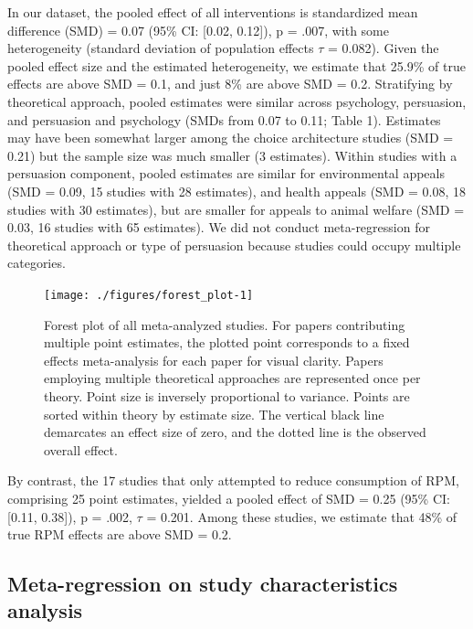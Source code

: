 \documentclass[sn-nature,referee,pdflatex]{sn-jnl}
\begin{document}
In our dataset, the pooled effect of all interventions is standardized
mean difference (SMD) = 0.07 (95\% CI: {[}0.02, 0.12{]}), p = .007, with
some heterogeneity (standard deviation of population effects \(\tau\) =
0.082). Given the pooled effect size and the estimated heterogeneity, we
estimate that 25.9\% of true effects are above SMD = 0.1, and just 8\%
are above SMD = 0.2. Stratifying by theoretical approach, pooled
estimates were similar across psychology, persuasion, and persuasion and
psychology (SMDs from 0.07 to 0.11; Table 1). Estimates may have been
somewhat larger among the choice architecture studies (SMD = 0.21) but
the sample size was much smaller (3 estimates). Within studies with a
persuasion component, pooled estimates are similar for environmental
appeals (SMD = 0.09, 15 studies with 28 estimates), and health appeals
(SMD = 0.08, 18 studies with 30 estimates), but are smaller for appeals
to animal welfare (SMD = 0.03, 16 studies with 65 estimates). We did not
conduct meta-regression for theoretical approach or type of persuasion
because studies could occupy multiple categories.

\begin{figure}[H]

{\centering \texttt{[image: ./figures/forest\_plot-1]} 

}

\caption{Forest plot of all meta-analyzed studies. For papers contributing multiple point estimates, the plotted point corresponds to a fixed effects meta-analysis for each paper for visual clarity. Papers employing multiple theoretical approaches are represented once per theory. Point size is inversely proportional to variance. Points are sorted within theory by estimate size. The vertical black line demarcates an effect size of zero, and the dotted line is the observed overall effect.}\label{fig:forest_plot}
\end{figure}

By contrast, the 17 studies that only attempted to reduce consumption of
RPM, comprising 25 point estimates, yielded a pooled effect of SMD =
0.25 (95\% CI: {[}0.11, 0.38{]}), p = .002, \(\tau\) = 0.201. Among
these studies, we estimate that 48\% of true RPM effects are above SMD =
0.2.

\subsection{Meta-regression on study characteristics
analysis}\label{sec2.4}
\end{document}
